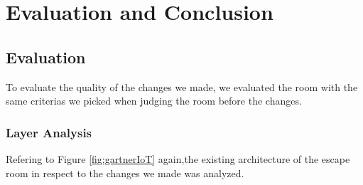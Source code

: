 
\chapter{Evaluation and Conclusion} %

\label{Chapter5} %

\section{Evaluation}
To evaluate the quality of the changes we made, 
we evaluated the room with the same criterias we picked when judging the room before the changes.

\subsection{Layer Analysis}
Refering to Figure \ref{fig:gartnerIoT} again,the existing architecture of the escape room in respect to the changes we made was analyzed.

